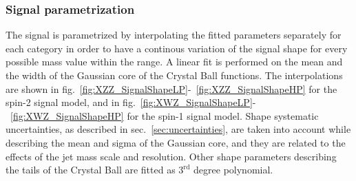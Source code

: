 


\subsubsection{Signal parametrization}
\label{ssec:signal_parametrization}

The signal is parametrized by interpolating the fitted parameters separately for each category in order to have a continous variation of the signal shape for every possible mass value within the range. A linear fit is performed on the mean and the width of the Gaussian core of the Crystal Ball functions. The interpolations are shown in fig.~\ref{fig:XZZ_SignalShapeLP}-~\ref{fig:XZZ_SignalShapeHP} for the spin-2 signal model, and in fig.~\ref{fig:XWZ_SignalShapeLP}-~\ref{fig:XWZ_SignalShapeHP} for the spin-1 signal model. Shape systematic uncertainties, as described in sec.~\ref{sec:uncertainties}, are taken into account while describing the mean and sigma of the Gaussian core, and they are related to the effects of the jet mass scale and resolution. Other shape parameters describing the tails of the Crystal Ball are fitted as $3^{\text{rd}}$ degree polynomial.


